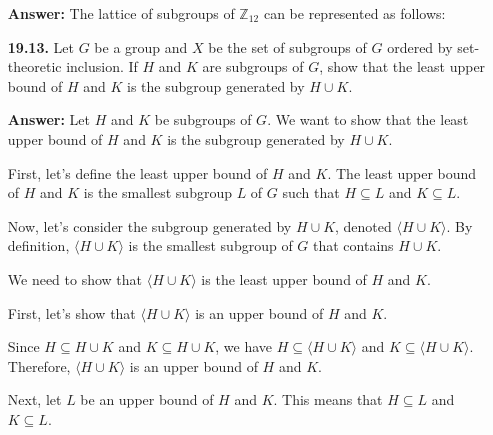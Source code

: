\documentclass[12pt,reqno]{amsart}
\newcommand{\probskip}{\vskip1cm}
\begin{document}
\begin{enumerate}[{\bf 1.}]
\textbf{Answer:} The lattice of subgroups of ${\mathbb Z}_{12}$ can be represented as follows:

\begin{center}
\end{center}

\probskip

\item[{\bf 19.13.}] 
Let $G$ be a group and $X$ be the set of subgroups of $G$ ordered by
set-theoretic inclusion. If $H$ and $K$ are subgroups of $G$, show
that the least upper bound of $H$ and $K$ is the subgroup generated by
$H \cup K$. 

\textbf{Answer:} Let $H$ and $K$ be subgroups of $G$. We want to show that the least upper bound of $H$ and $K$ is the subgroup generated by $H \cup K$.

First, let's define the least upper bound of $H$ and $K$. The least upper bound of $H$ and $K$ is the smallest subgroup $L$ of $G$ such that $H \subseteq L$ and $K \subseteq L$. 

Now, let's consider the subgroup generated by $H \cup K$, denoted $\langle H \cup K \rangle$. By definition, $\langle H \cup K \rangle$ is the smallest subgroup of $G$ that contains $H \cup K$. 

We need to show that $\langle H \cup K \rangle$ is the least upper bound of $H$ and $K$. 

First, let's show that $\langle H \cup K \rangle$ is an upper bound of $H$ and $K$. 

Since $H \subseteq H \cup K$ and $K \subseteq H \cup K$, we have $H \subseteq \langle H \cup K \rangle$ and $K \subseteq \langle H \cup K \rangle$. Therefore, $\langle H \cup K \rangle$ is an upper bound of $H$ and $K$. 

Next, let $L$ be an upper bound of $H$ and $K$. This means that $H \subseteq L$ and $K \subseteq L$. 


\end{enumerate}
\end{document}
